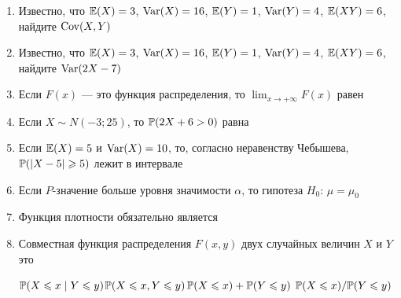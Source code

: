 \documentclass[12pt, a4paper]{article}\usepackage[]{graphicx}\usepackage[]{color}
\begin{document}
\begin{enumerate}

					\item Известно, что $\E(X)=3$, $\Var(X)=16$, $\E(Y)=1$, $\Var(Y)=4$, $\E(XY)=6$, найдите $\Cov(X,Y)$



					\item Известно, что $\E(X)=3$, $\Var(X)=16$, $\E(Y)=1$, $\Var(Y)=4$, $\E(XY)=6$, найдите $\Var(2X-7)$


					\item Если $F(x)$ — это функция распределения, то $\lim_{x\to +\infty}F(x)$ равен


					\item Если $X\sim N(-3;25)$, то $\P(2X+6>0)$ равна


					\item Если $\E(X)=5$ и $\Var(X)=10$, то, согласно неравенству Чебышева, $\P(|X-5|\geq 5)$ лежит в интервале

					\otvet{$[0;1]$}{$[0;0.4]$}{$[0.4;1]$}{$[0;0.6]$}{$[0.6;1]$}

					\item Если $P$-значение больше уровня значимости $\alpha$, то гипотеза $H_0$: $\mu=\mu_0$


					\item Функция плотности обязательно является


					\item Совместная функция распределения $F(x,y)$ двух случайных величин $X$ и $Y$ это

					{$\P(X\leq x\mid Y\leq y)$}{$\P(X\leq x,Y\leq y)$}{$\P(X\leq x)+\P(Y\leq y)$}
					{$\P(X\leq x)/ \P(Y\leq y)$}


\end{enumerate}
\end{document}

